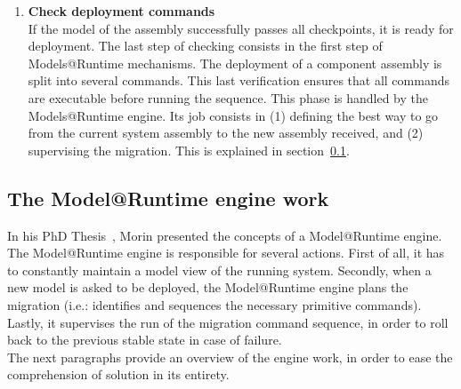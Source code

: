 \begin{enumerate}
\item {\bf Check deployment commands}\\
If the model of the assembly successfully passes all checkpoints, it is ready for deployment. The last step of checking consists in the first step of Models@Runtime mechanisms. The deployment of a component assembly is split into several commands. This last verification ensures that all commands are executable before running the sequence. This phase is handled by the Models@Runtime engine. Its job consists in (1) defining the best way to go from the current system assembly to the new assembly received, and (2) supervising the migration. This is explained in section~\ref{subsec:modelatruntime}.

 
\end{enumerate}



\subsection{The Model@Runtime engine work}
\label{subsec:modelatruntime}
In his PhD Thesis~\cite{Morin:2010}, Morin presented the concepts of a Model@Runtime engine. The Model@Runtime engine is responsible for several actions. First of all, it has to constantly maintain a model view of the running system. Secondly, when a new model is asked to be deployed, the Model@Runtime engine plans the migration (i.e.: identifies and sequences the necessary primitive commands). Lastly, it supervises the run of the migration command sequence, in order to roll back to the previous stable state in case of failure.\\
The next paragraphs provide an overview of the engine work, in order to ease the comprehension of solution in its entirety.\\

